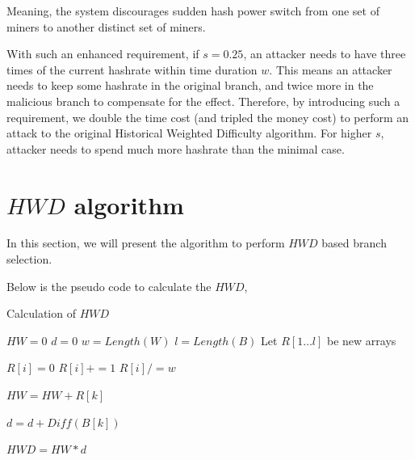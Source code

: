 \documentclass[conference]{IEEEtran}
\begin{document}
Meaning, the system discourages sudden hash power switch from one set of miners to another distinct set of miners.

With such an enhanced requirement, if $s=0.25$, an attacker needs to have three times of the current hashrate within time duration $w$. This means an attacker needs to keep some hashrate in the original branch, and twice more in the malicious branch to compensate for the effect. Therefore, by introducing such a requirement, we double the time cost (and tripled the money cost) to perform an attack to the original Historical Weighted Difficulty algorithm. For higher $s$, attacker needs to spend much more hashrate than the minimal case. 

\section{$H\!W\!D$ algorithm}
In this section, we will present the algorithm to perform $H\!W\!D$ based branch selection.

Below is the pseudo code to calculate the $H\!W\!D$,

\makeatletter
\def\BState{\State\hskip-\ALG@thistlm}
\makeatother

\begin{algorithm}
\caption{Calculation of $H\!W\!D$}\label{euclid}
\begin{algorithmic}[1]
    \State ${H\!W} = 0$
    \State $d = 0$
    \State $w = Length(W)$
    \State $l = Length(B)$
    \State Let $R[1 \ldots l]$ be new arrays
    
        \State $R[i] = 0$
                \State $R[i] += 1$
            \EndIf
            \State $R[i] /= w$
        \EndFor
    \EndFor

        \State ${H\!W} = {H\!W} + R[k]$
    \EndFor

        \State $d = d + Diff(B[k])$
    \EndFor

    \State ${H\!W\!D} = {H\!W} * d$
\EndFunction
\end{algorithmic}
\end{algorithm}
\end{document}
